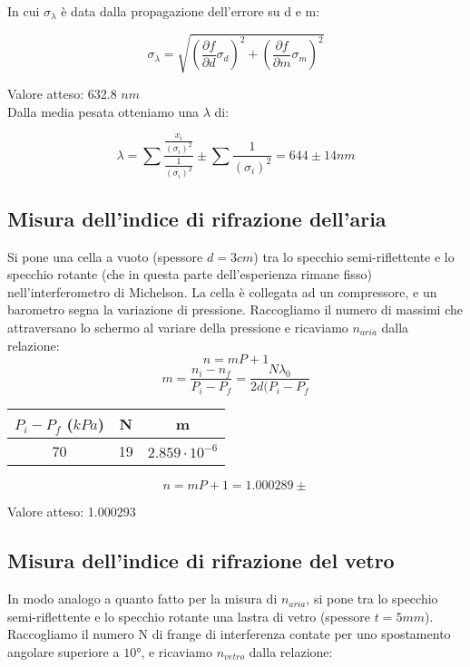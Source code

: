 \documentclass[a4paper,10pt]{report}
\begin{document}
In cui $\sigma_{\lambda}$ è data dalla propagazione dell'errore su d e m:

$$ \sigma_{\lambda} = \sqrt{ ( \frac{\partial f}{\partial d} \sigma_{d} )^2 + ( \frac{\partial f}{\partial m} \sigma_{m} )^2 } $$

Valore atteso: 632.8 $nm$\\

Dalla media pesata otteniamo una $\lambda$ di:

$$ \lambda =\displaystyle \sum{\frac{\frac{x_i}{(\sigma_i)^2}}{\frac{1}{(\sigma_i)^2}}} \pm \displaystyle\sum{\frac{1}{(\sigma_i)^2}} = 644 \pm 14 nm $$



\subsection{Misura dell'indice di rifrazione dell'aria}

Si pone una cella a vuoto (spessore $d=3 cm$) tra lo specchio semi-riflettente e lo specchio rotante (che in questa parte dell'esperienza rimane fisso) nell'interferometro di Michelson. La cella è collegata ad un compressore, e un barometro segna la variazione di pressione.
Raccogliamo il numero di massimi che attraversano lo schermo al variare della pressione e ricaviamo $n_{aria}$ dalla relazione:
$$ n = mP+1 $$
$$ m = \frac{n_i - n_f}{P_i-P_f} = \frac{N \lambda_0}{2d(P_i-P_f}$$

\begin{center}
\begin{tabular}{c|c|c}
$P_i-P_f$ ($kPa$) & N & m \\
\midrule
70 & 19 & $2.859\cdot10^{-6}$\\
\end{tabular}
\end{center}

$$ n = mP+1 = 1.000289 \pm $$

Valore atteso: 1.000293

\subsection{Misura dell'indice di rifrazione del vetro}

In modo analogo a quanto fatto per la misura di $n_{aria}$, si pone tra lo specchio semi-riflettente e lo specchio rotante una lastra di vetro (spessore $t= 5 mm$). Raccogliamo il numero N di frange di interferenza contate per uno spostamento angolare superiore a $10°$, e ricaviamo $n_{vetro}$ dalla relazione:
\end{document}
